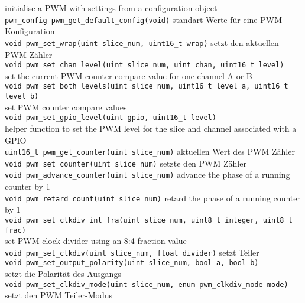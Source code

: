 \documentclass[a4paper,12pt,twoside]{article}
\begin{document}
\begin{tabbing}
	\>  \hspace{2mm} initialise a PWM with settings from a configuration object \\
	\> \verb|pwm_config pwm_get_default_config(void)| \> standart Werte für eine PWM Konfiguration \\
	\> \verb|void pwm_set_wrap(uint slice_num, uint16_t wrap)| \> setzt den aktuellen PWM Zähler \\
	\> \verb|void pwm_set_chan_level(uint slice_num, uint chan, uint16_t level)| \\
	\>  \hspace{2mm} set the current PWM counter compare value for one channel A or B\\
	\> \verb|void pwm_set_both_levels(uint slice_num, uint16_t level_a, uint16_t level_b)| \\
	\>  \hspace{2mm} set PWM counter compare values \\
	\> \verb|void pwm_set_gpio_level(uint gpio, uint16_t level)| \\
	\>  \hspace{2mm} helper function to set the PWM level for the slice and channel associated with a GPIO \\
	\> \verb|uint16_t pwm_get_counter(uint slice_num)| \> aktuellen Wert des PWM Zähler \\
	\> \verb|void pwm_set_counter(uint slice_num)| \> setzte den PWM Zähler \\
	\> \verb|void pwm_advance_counter(uint slice_num)| \> advance the phase of a running counter by 1 \\
	\> \verb|void pwm_retard_count(uint slice_num)| \> retard the phase of a running counter by 1 \\
	\> \verb|void pwm_set_clkdiv_int_fra(uint slice_num, uint8_t integer, uint8_t frac)| \\
	\>  \hspace{2mm} set PWM clock divider using an 8:4 fraction value \\
	\> \verb|void pwm_set_clkdiv(uint slice_num, float divider)| \> setzt Teiler \\
	\> \verb|void pwm_set_output_polarity(uint slice_num, bool a, bool b)| \\
	\>  \hspace{2mm} setzt die Polarität des Ausgangs \\
	\> \verb|void pwm_set_clkdiv_mode(uint slice_num, enum pwm_clkdiv_mode mode)| \\
	\>  \hspace{2mm} setzt den PWM Teiler-Modus \\

\end{tabbing}
\end{document}
